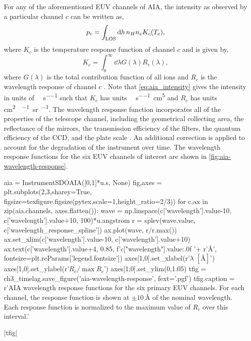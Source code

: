 For any of the aforementioned EUV channels of AIA, the intensity as observed by a particular channel $c$ can be written as,
\begin{equation}\label{eq:aia_intensity}
    p_c = \int_\textup{LOS}\textup{d}h\,n_Hn_eK_c(T_e),
\end{equation}
where $K_c$ is the temperature response function of channel $c$ and is given by,
\begin{equation}\label{eq:temperature_response}
    K_c = \int_0^\infty\dd{\lambda}G(\lambda)R_c(\lambda),
\end{equation}
where $G(\lambda)$ is the total contribution function of all ions and $R_c$ is the wavelength response of channel $c$ \citep{boerner_initial_2012}. Note that \autoref{eq:aia_intensity} gives the intensity in units of \si{\dn\per\pixel\per\second} such that $K_c$ has units \si{\dn\per\pixel\per\second\cm\tothe{5}} and $R_c$ has units \si{\cm\squared\dn\per\photon\steradian\per\pixel}. The wavelength response function incorporates all of the properties of the telescope channel, including the geometrical collecting area, the reflectance of the mirrors, the transmission efficiency of the filters, the quantum efficiency of the CCD, and the plate scale \citep[see Section 2 and Table 2 of][]{boerner_initial_2012}. An additional correction is applied to account for the degradation of the instrument over time. The wavelength response functions for the six EUV channels of interest are shown in \autoref{fig:aia-wavelength-response}.

\begin{pycode}
aia = InstrumentSDOAIA([0,1]*u.s, None)
fig,axes = plt.subplots(2,3,sharey=True,
                        figsize=texfigure.figsize(pytex,scale=1,height_ratio=2/3))
for c,ax in zip(aia.channels, axes.flatten()):
    wave = np.linspace(c['wavelength'].value-10, c['wavelength'].value+10, 100)*u.angstrom
    r = splev(wave.value, c['wavelength_response_spline'])
    ax.plot(wave, r/r.max())
    ax.set_xlim(c['wavelength'].value-10, c['wavelength'].value+10)
    ax.text(c['wavelength'].value+4, 0.85, f'{c["wavelength"].value:.0f} '+ r'$\si{\angstrom}$',
            fontsize=plt.rcParams['legend.fontsize'])
axes[1,0].set_xlabel(r'$\lambda$ $[\si{\angstrom}]$')
axes[1,0].set_ylabel(r'$R_c/\max{R_c}$')
axes[1,0].set_ylim(0,1.05)
tfig = ch3_timelag.save_figure('aia-wavelength-response', fext='.pgf')
tfig.caption = r'AIA wavelength response functions for the six primary EUV channels. For each channel, the response function is shown at $\pm\SI{10}{\angstrom}$ of the nominal wavelength. Each response function is normalized to the maximum value of $R_c$ over this interval.'
\end{pycode}
|tfig|

